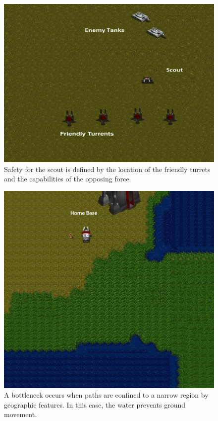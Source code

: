 \documentclass[11pt,letterpaper]{article}
\begin{document}
\begin{figure}
  \includegraphics[width=\columnwidth*.3]{figures/safety-3.jpg}
  \caption{Safety for the scout is defined by the location of the friendly turrets and the capabilities of the opposing force.}
  \label{fig:safety}
\end{figure}

\begin{figure}
  \includegraphics[width=\columnwidth*.3]{figures/bottleneck.JPG}
  \caption{A bottleneck occurs when paths are confined to a narrow region by geographic features.  In this case, the water prevents ground movement.}
  \label{fig:safety}
\end{figure}
\end{document}
